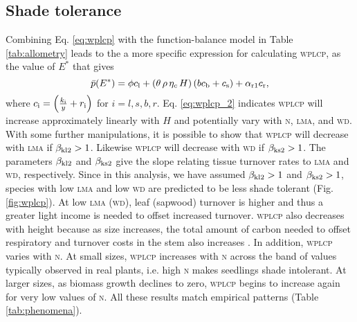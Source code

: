 \documentclass[9pt,twocolumn,twoside,lineno]{pnas-new}
\newcommand{\wplcp}{\textsc{wplcp}}
\newcommand{\lma}{\textsc{lma}}
\newcommand{\wood}{\textsc{wd}}
\newcommand{\nitrogen}{\textsc{n}}
\begin{document}
\subsection*{Shade tolerance}
Combining Eq. \ref{eq:wplcp} with the function-balance model in Table \ref{tab:allometry} leads to the a more specific expression for calculating {\wplcp}, as the value of $E^*$ that gives
\begin{equation}\label{eq:wplcp_2}
\bar{p}(E^*) =
      \phi c_{\rm l} +
      \left(\theta \, \rho \, \eta_c \, H\right)
        \left(b c_{\rm b}
            + c_{\rm s}\right) +
      \alpha_{\rm r1} c_{\rm r},
\end{equation}
where $c_{\rm i} = \left(\frac{k_{\rm i}}{y} + r_{\rm i}\right)$ for $i=l,s,b,r$.
Eq. \ref{eq:wplcp_2} indicates {\wplcp} will increase approximately linearly with $H$ and potentially vary with {\nitrogen}, {\lma}, and {\wood}. With some further manipulations, it is possible to show that {\wplcp} will decrease with {\lma} if $\beta_{{\rm kl2}} >1$. Likewise {\wplcp} will decrease with {\wood} if $\beta_{{\rm ks2}} >1$. The parameters $\beta_{{\rm kl2}}$ and $\beta_{{\rm ks2}}$ give the slope relating tissue turnover rates to {\lma} and {\wood}, respectively. Since in this analysis, we have assumed $\beta_{{\rm kl2}} >1$ and $\beta_{{\rm ks2}} >1$, species with low {\lma} and low {\wood} are predicted to be less shade tolerant (Fig. \ref{fig:wplcp}). At low {\lma} ({\wood}), leaf (sapwood) turnover is higher and thus a greater light income is needed to offset increased turnover. {\wplcp} also decreases with height because as size increases, the total amount of carbon needed to offset respiratory and turnover costs in the stem also increases \citep{Givnish-1988}. In addition, {\wplcp} varies with {\nitrogen}. At small sizes, {\wplcp} increases with {\nitrogen} across the band of values typically observed in real plants, i.e. high {\nitrogen} makes seedlings shade intolerant. At larger sizes, as biomass growth declines to zero, {\wplcp} begins to increase again for very low values of {\nitrogen}. All these results  match empirical patterns (Table \ref{tab:phenomena}).


\newcommand{\sepp}{{\color{grey}/}}
\newcommand{\upup}{$\uparrow\,\uparrow$}
\newcommand{\updo}{$\uparrow\,\downarrow$}
\newcommand{\dodo}{$\downarrow\,\downarrow$}
\newcommand{\upfl}{$\uparrow$\,--}
\newcommand{\flup}{--$\,\uparrow$}
\newcommand{\dofl}{$\downarrow\,$--}
\newcommand{\doup}{$\downarrow\,\uparrow$}
\newcommand{\fldo}{--$\,\downarrow$}
\end{document}
